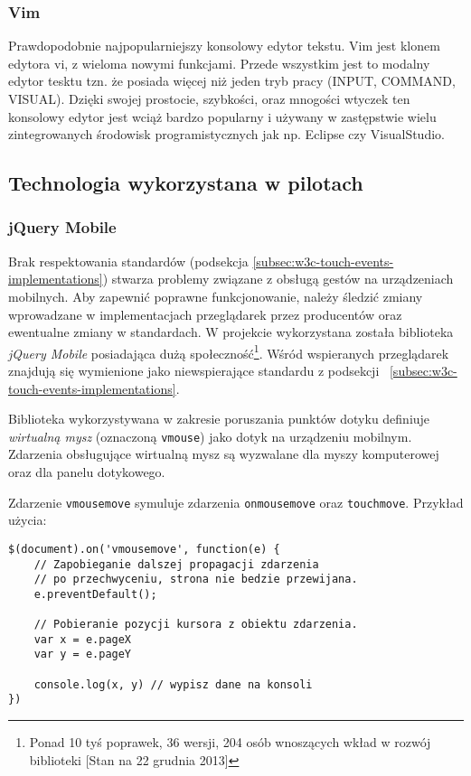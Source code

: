 \subsubsection{Vim}
\label{sub:Vim}
Prawdopodobnie najpopularniejszy konsolowy edytor tekstu. Vim jest klonem edytora vi, z wieloma nowymi funkcjami. Przede wszystkim jest to modalny edytor tesktu tzn. że posiada więcej niż jeden tryb pracy (INPUT, COMMAND, VISUAL). Dzięki swojej prostocie, szybkości, oraz mnogości wtyczek ten konsolowy edytor jest wciąż bardzo popularny i używany w zastępstwie wielu zintegrowanych środowisk programistycznych jak np. Eclipse czy VisualStudio.  

\subsection{Technologia wykorzystana w pilotach}

\subsubsection{jQuery Mobile}
\label{subsub:tool-jquery-mobile}

Brak respektowania standardów (podsekcja \ref{subsec:w3c-touch-events-implementations}) stwarza problemy związane z obsługą gestów na urządzeniach mobilnych. Aby zapewnić poprawne funkcjonowanie, należy śledzić zmiany wprowadzane w implementacjach przeglądarek przez producentów oraz ewentualne zmiany w standardach. W projekcie wykorzystana została biblioteka \emph{jQuery Mobile} posiadająca dużą społeczność\footnote{Ponad 10 tyś poprawek, 36 wersji, 204 osób wnoszących wkład w rozwój biblioteki [Stan na 22 grudnia 2013]}. Wśród wspieranych przeglądarek znajdują się wymienione jako niewspierające standardu z podsekcji ~\ref{subsec:w3c-touch-events-implementations}.

Biblioteka wykorzystywana w zakresie poruszania punktów dotyku definiuje \emph{wirtualną mysz} (oznaczoną \lstinline{vmouse}) jako dotyk na urządzeniu mobilnym. Zdarzenia obsługujące wirtualną mysz są wyzwalane dla myszy komputerowej oraz dla panelu dotykowego.

Zdarzenie \lstinline{vmousemove} symuluje zdarzenia \lstinline{onmousemove} oraz \lstinline{touchmove}. Przykład użycia:

\lstset{language=JavaScript}
\begin{lstlisting}
$(document).on('vmousemove', function(e) {
	// Zapobieganie dalszej propagacji zdarzenia
	// po przechwyceniu, strona nie bedzie przewijana.
	e.preventDefault();
	
	// Pobieranie pozycji kursora z obiektu zdarzenia.
	var x = e.pageX
	var y = e.pageY
	
	console.log(x, y) // wypisz dane na konsoli
})
\end{lstlisting}

